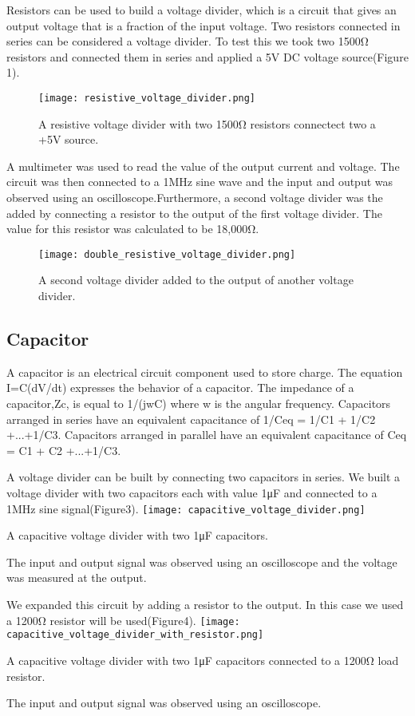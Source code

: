 \documentclass[12pt]{article}
\begin{document}
Resistors can be used to build a voltage divider, which is a circuit
that gives an output voltage that is a fraction of the input
voltage. Two resistors connected in series can be considered a voltage
divider. To test this we took two 1500Ω resistors and connected them in
series and applied a 5V DC voltage source(Figure 1).
\begin {figure}[!h]
\centering 
\texttt{[image: resistive\_voltage\_divider.png]}
\caption{\label{rvd} A resistive voltage divider with two 1500Ω 
resistors connectect two a +5V source. }
\end {figure}
A multimeter was used to read the value of the output current and
voltage. The circuit was then connected to a 1MHz sine wave and the
input and output was observed using an oscilloscope.Furthermore, a
second voltage divider was the added by connecting a resistor to the
output of the first voltage divider. The value for this resistor was
calculated to be 18,000Ω.
\begin {figure}[!h]
\centering
\texttt{[image: double\_resistive\_voltage\_divider.png]}
\caption{\label{rvd} A second voltage divider added to the output of
another voltage divider. }
\end {figure} 

\subsection {Capacitor}
A capacitor is an electrical circuit component used to store charge. The
equation I=C(dV/dt) expresses the behavior of a capacitor. The impedance
of a capacitor,Zc, is equal to 1/(jwC) where w is the angular
frequency. Capacitors arranged in series have an equivalent capacitance
of 1/Ceq = 1/C1 + 1/C2 +...+1/C3. Capacitors arranged in parallel have
an equivalent capacitance of Ceq = C1 + C2 +...+1/C3. 

A voltage divider can be built by connecting two capacitors in
series. We built a voltage divider with two capacitors each with value
1μF and connected to a 1MHz sine signal(Figure3).
\texttt{[image: capacitive\_voltage\_divider.png]}
\caption{\label{rvd} A capacitive voltage divider with two 1μF
capacitors. }
The input and output signal was observed using an oscilloscope and the
voltage was measured at the output.

We expanded this circuit by adding a resistor to the output. In this
case we used a 1200Ω resistor will be used(Figure4).
\texttt{[image: capacitive\_voltage\_divider\_with\_resistor.png]}
\caption{\label{rvd} A capacitive voltage divider with two 1μF                                
capacitors connected to a 1200Ω load resistor. }
The input and output signal was observed using an oscilloscope. 
\end{document}
